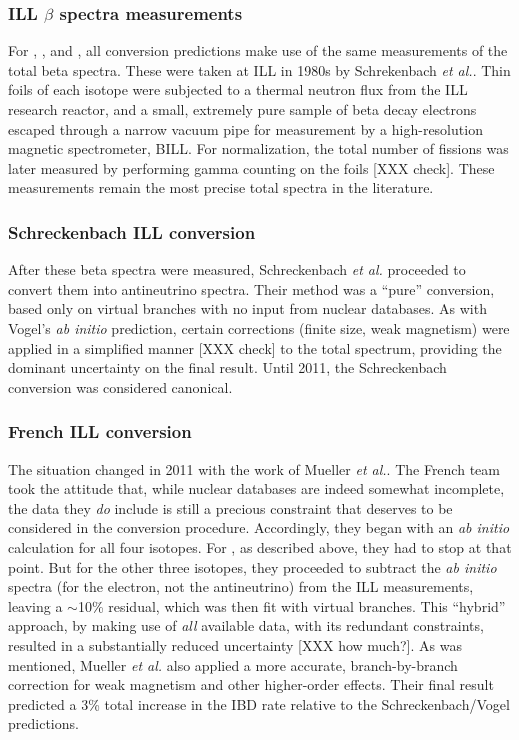 \documentclass[../thesis.tex]{subfiles}
\begin{document}
\subsubsection{ILL $\beta$ spectra measurements}
\label{sec:illmeas}

For \urfive, \punine, and \puone, all conversion predictions make use of the
same measurements of the total beta spectra. These were taken at ILL in 1980s by
Schrekenbach \emph{et al.}. Thin foils of each isotope were subjected to a
thermal neutron flux from the ILL research reactor, and a small, extremely pure
sample of beta decay electrons escaped through a narrow vacuum pipe for
measurement by a high-resolution magnetic spectrometer, BILL. For normalization,
the total number of fissions was later measured by performing gamma counting on
the foils [XXX check]. These measurements remain the most precise total spectra
in the literature.

\subsubsection{Schreckenbach ILL conversion}
\label{sec:schreck}

After these beta spectra were measured, Schreckenbach \emph{et al.} proceeded to
convert them into antineutrino spectra. Their method was a ``pure'' conversion,
based only on virtual branches with no input from nuclear databases. As with
Vogel's \ureight \emph{ab initio} prediction, certain corrections (finite size,
weak magnetism) were applied in a simplified manner [XXX check] to the total
spectrum, providing the dominant uncertainty on the final result. Until 2011,
the Schreckenbach conversion was considered canonical.

\subsubsection{French ILL conversion}
\label{sec:frenchconv}

The situation changed in 2011 with the work of Mueller \emph{et al.}. The French
team took the attitude that, while nuclear databases are indeed somewhat
incomplete, the data they \emph{do} include is still a precious constraint that
deserves to be considered in the conversion procedure. Accordingly, they began
with an \emph{ab initio} calculation for all four isotopes. For \ureight, as
described above, they had to stop at that point. But for the other three
isotopes, they proceeded to subtract the \emph{ab initio} spectra (for the
electron, not the antineutrino) from the ILL measurements, leaving a $\sim$10\%
residual, which was then fit with virtual branches. This ``hybrid'' approach, by
making use of \emph{all} available data, with its redundant constraints,
resulted in a substantially reduced uncertainty [XXX how much?]. As was
mentioned, Mueller \emph{et al.} also applied a more accurate, branch-by-branch
correction for weak magnetism and other higher-order effects. Their final result
predicted a 3\% total increase in the IBD rate relative to the
Schreckenbach/Vogel predictions.
\end{document}
